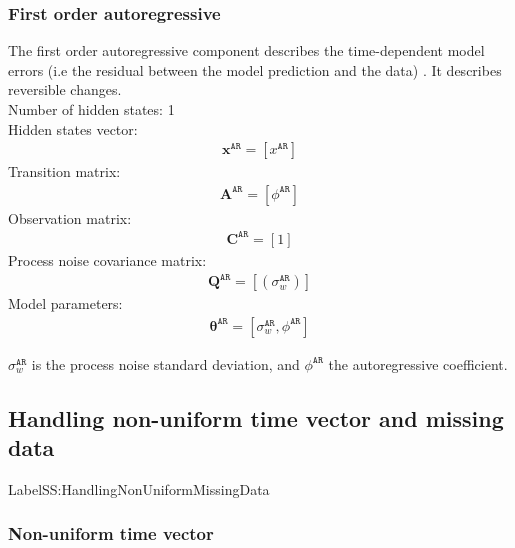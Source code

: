\subsubsection{First order autoregressive}

The first order autoregressive component describes the time-dependent model errors (i.e the residual between the model prediction and the data) \cite{STC:STC2035}. 
It describes reversible changes.\\

\noindent
Number of hidden states: 1\\

Hidden states vector: 
\begin{gather*}
\mathbf{x}^{\mathtt{AR}} = [x^{\mathtt{AR}}]
\end{gather*}
Transition matrix: 
\begin{gather*}
\mathbf{A}^{\mathtt{AR}}=  [\phi^{\mathtt{AR}}]
\end{gather*}
Observation matrix: 
\begin{gather*}
\mathbf{C}^{\mathtt{AR}}=[1]
\end{gather*}
Process noise covariance matrix: 
\begin{gather*}
\mathbf{Q}^{\mathtt{AR}}=[(\sigma_{w}^{\mathtt{AR}})]
\end{gather*}
Model parameters: 
\begin{gather*}
\bm\theta^{\mathtt{AR}}=[\sigma_{w}^{\mathtt{AR}}, \phi^{\mathtt{AR}} ]
\end{gather*}

\noindent
$\sigma_{w}^{\mathtt{AR}}$ is the process noise standard deviation, and $\phi^{\mathtt{AR}}$ the autoregressive coefficient.

\subsection{Handling non-uniform time vector and missing data}
Label{SS:HandlingNonUniformMissingData}

\subsubsection{Non-uniform time vector}
\label{SS:NonUniform}

